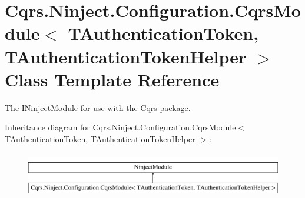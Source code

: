\hypertarget{classCqrs_1_1Ninject_1_1Configuration_1_1CqrsModule}{}\section{Cqrs.\+Ninject.\+Configuration.\+Cqrs\+Module$<$ T\+Authentication\+Token, T\+Authentication\+Token\+Helper $>$ Class Template Reference}
\label{classCqrs_1_1Ninject_1_1Configuration_1_1CqrsModule}


The I\+Ninject\+Module for use with the \hyperlink{namespaceCqrs}{Cqrs} package.  


Inheritance diagram for Cqrs.\+Ninject.\+Configuration.\+Cqrs\+Module$<$ T\+Authentication\+Token, T\+Authentication\+Token\+Helper $>$\+:\begin{figure}[H]
\begin{center}
\leavevmode
\includegraphics[height=2.000000cm]{classCqrs_1_1Ninject_1_1Configuration_1_1CqrsModule}
\end{center}
\end{figure}
